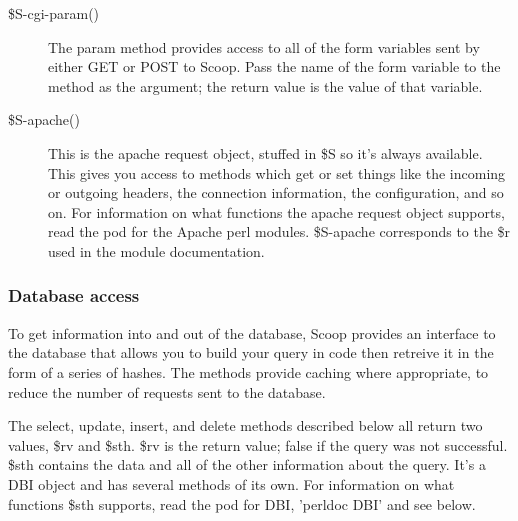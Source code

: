 \begin{description}
\item[\$S-\latexhtml{$>$}{>}cgi-\latexhtml{$>$}{>}param()] The param method provides access to all of the form variables sent by either GET or POST to Scoop. Pass the name of the form variable to the method as the argument; the return value is the value of that variable.
\item[\$S-\latexhtml{$>$}{>}apache()] This is the apache request object, stuffed in \$S so it's always available. This gives you access to methods which get or set things like the incoming or outgoing headers, the connection information, the configuration, and so on. For information on what functions the apache request object supports, read the pod for the Apache perl modules. \$S-\latexhtml{$>$}{>}apache corresponds to the \$r used in the module documentation.
\end{description}

\subsubsection{Database access}

To get information into and out of the database, Scoop provides an interface to the database that allows you to build your query in code then retreive it in the form of a series of hashes. The methods provide caching where appropriate, to reduce the number of requests sent to the database.

The select, update, insert, and delete methods described below all return two values, \$rv and \$sth. \$rv is the return value; false if the query was not successful. \$sth contains the data and all of the other information about the query. It's a DBI object and has several methods of its own.  For information on what functions \$sth supports, read the pod for DBI, 'perldoc DBI' and see below.

